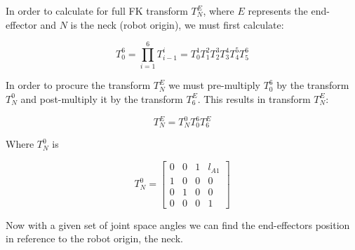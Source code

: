 In order to calculate for full FK transform $T_{N}^{E}$, where $E$ represents the end-effector and $N$ is the neck (robot origin), we must first calculate:

\begin{equation}\label{eq:t06}
T_0^6 = \prod_{i=1}^{6} T_{i-1}^{i} = T_{0}^{1}T_{1}^{2}T_{2}^{3}T_{3}^{4}T_{4}^{5}T_{5}^{6}
\end{equation}

In order to procure the transform $T_{N}^{E}$ we must pre-multiply $T_{0}^{6}$ by the transform $T_{N}^{0}$ and post-multiply it by the transform $T_{6}^{E}$.  
This results in transform $T_{N}^{E}$:

\begin{equation}
T_{N}^{E} = T_{N}^{0}T_{0}^{6}T_{6}^{E}
\end{equation}

Where $T_{N}^{0}$ is

\begin{equation}
T_{N}^{0} = \left[ \begin{array}{cccc} 
0 & 0 & 1 &  l_{A1} \\ 
1 & 0 & 0 &  0        \\
0 & 1 & 0 &  0        \\
0 & 0 & 0 &  1                 
\end{array} \right]
\end{equation} 


Now with a given set of joint space angles we can find the end-effectors position in reference to the robot origin, the neck.

